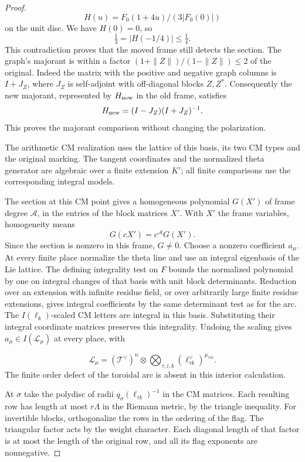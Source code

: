 \begin{proof}
\[
  H(u)=F_0(1+4u)/(3|F_0(0)|)
\]
 on the unit disc.
We have \(H(0)=0\), so
\[
      \tfrac13=|H(-1/4)|\le\tfrac14 .
\]
This contradiction proves that the moved frame still
detects the section.
The graph's majorant is within a factor
\((1+\|Z\|)/(1-\|Z\|)\le2\) of the original. Indeed the
matrix with the positive and negative graph columns is
\(I+J_Z\), where \(J_Z\) is self-adjoint with off-diagonal
blocks \(Z,Z^*\). Consequently the new majorant, represented by \(H_{\rm new}\) in the old frame, satisfies
\[
  H_{\rm new}=(I-J_Z)(I+J_Z)^{-1}.
\]
 This proves the
majorant comparison without changing the polarization.

The arithmetic CM realization uses the lattice of this
basis, its two CM types and the original marking. The
tangent coordinates and the normalized theta generator
are algebraic over a finite extension \(K'\); all finite
comparisons use the corresponding integral models.
\label{cor:slice-integral-norm-5}

The section at this CM point gives a homogeneous polynomial
\(G(X')\) of frame degree \(\mathcal A\), in the entries of the
block matrices \(X'\).
With \(X'\) the frame variables, homogeneity means
\[
  G(cX')=c^{\mathcal A}G(X') .
\]
 Since the section is nonzero in this frame, \(G\ne0\). Choose a nonzero coefficient \(a_\mu\).
At every finite place normalize the theta line and use an
integral eigenbasis of the Lie lattice. The defining
integrality test on \(F\) bounds the normalized polynomial
by one on integral changes of that basis with unit block
determinants. Reduction over an extension with infinite
residue field, or over arbitrarily large finite residue
extensions, gives integral coefficients by the same
determinant test as for the arc. The \(I(\ell_k)\)-scaled
CM letters are integral in this basis. Substituting their
integral coordinate matrices preserves this integrality.
Undoing the scaling gives
\(a_\mu\in I(\mathcal L_\mu)\) at every place, with

\[
  \mathcal L_\mu=(\mathcal T^\vee)^n
\otimes\bigotimes_{\tau,i,k}(\ell_{\tau k}^\vee)^{\mu_{\tau i k}}.
\]
The finite order defect of the toroidal arc is absent in
this interior calculation.
\label{cor:slice-integral-norm-6}

At \(\sigma\) take the polydisc of radii
\(q_\sigma(\ell_{\tau k})^{-1}\) in the CM matrices.
Each resulting row has length at most \(r\Lambda\) in the
Riemann metric, by the triangle inequality. For invertible
blocks, orthogonalize the rows in the ordering of the flag.
The triangular factor acts by the weight character.
Each diagonal length of that factor is at most the
length of the original row, and all its flag exponents
are nonnegative.


\end{proof}
